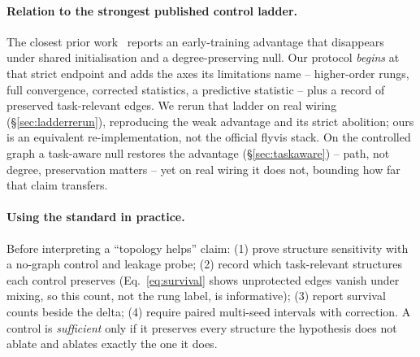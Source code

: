 \documentclass[10pt,twocolumn,letterpaper]{article}
\begin{document}
\paragraph{Relation to the strongest published control ladder.}
The closest prior work~\cite{toposens2026} reports an early-training advantage
that disappears under shared initialisation and a degree-preserving null. Our
protocol \emph{begins} at that strict endpoint and adds the axes its
limitations name -- higher-order rungs, full convergence, corrected statistics,
a predictive statistic -- plus a record of preserved task-relevant edges. We
rerun that ladder on real wiring (\S\ref{sec:ladderrerun}), reproducing the
weak advantage and its strict abolition; ours is an equivalent
re-implementation, not the official flyvis stack. On the controlled graph a
task-aware null restores the advantage (\S\ref{sec:taskaware}) -- path, not
degree, preservation matters -- yet on real wiring it does not, bounding how
far that claim transfers.

\paragraph{Using the standard in practice.}
Before interpreting a ``topology helps'' claim: (1) prove structure
sensitivity with a no-graph control and leakage probe; (2) record which
task-relevant structures each control preserves (Eq.~\eqref{eq:survival}
shows unprotected edges vanish under mixing, so this count, not the rung
label, is informative); (3) report survival counts beside the delta; (4)
require paired multi-seed intervals with correction. A control is
\emph{sufficient} only if it preserves every structure the hypothesis does not
ablate and ablates exactly the one it does.
\end{document}
